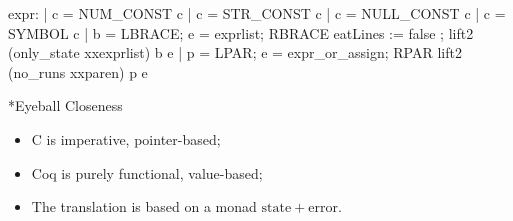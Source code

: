 \documentclass{beamer}
\begin{document}
\frame{\questiontoc}

\begin{frame}[fragile]
    \label{frame:parser}


\begin{camlcode}
expr:
  | c = NUM_CONST                       { c }
  | c = STR_CONST                       { c }
  | c = NULL_CONST                      { c }
  | c = SYMBOL                          { c }
  | b = LBRACE; e = exprlist; RBRACE
    { eatLines := false ;
      lift2 (only_state xxexprlist) b e }
  | p = LPAR; e = expr_or_assign; RPAR
    { lift2 (no_runs xxparen) p e }
\end{camlcode}

\end{frame}

\frame{\questiontoc}

\sectionframe**{Eyeball Closeness}{
    \label{frame:eyeball}
    \begin{itemize}
        \item C is imperative, pointer-based;
        \item Coq is purely functional, value-based;
        \item The translation is based on a monad \(\mathrm{state}+\mathrm{error}\).
    \end{itemize}
}
\end{document}
